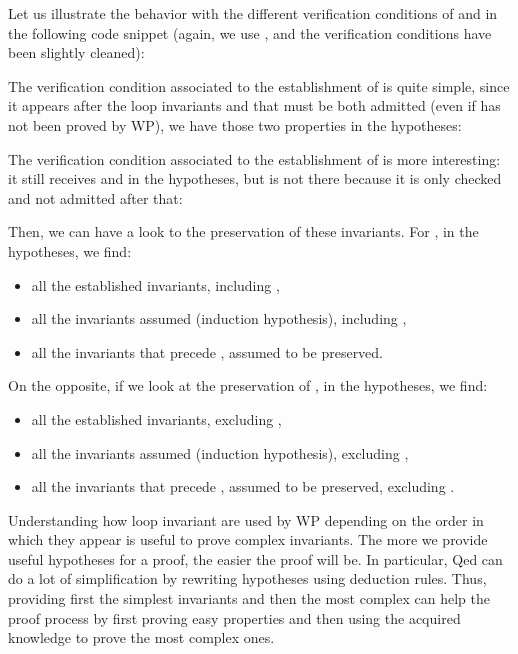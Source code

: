 Let us illustrate the behavior with the different verification conditions of
 and  in the following code snippet (again, we
use , and the verification conditions have been slightly
cleaned):




The verification condition associated to the establishment of  is
quite simple, since it appears after the loop invariants  and
 that must be both admitted (even if  has not been
proved by WP), we have those two properties in the hypotheses:




The verification condition associated to the establishment of  is
more interesting: it still receives  and  in the
hypotheses, but  is not there because it is only checked and not
admitted after that:




Then, we can have a look to the preservation of these invariants. For
, in the hypotheses, we find:
\begin{itemize}
  \item all the established invariants, including ,
  \item all the invariants assumed (induction hypothesis), including ,
  \item all the invariants that precede , assumed to be preserved.
\end{itemize}




On the opposite, if we look at the preservation of , in the
hypotheses, we find:
\begin{itemize}
  \item all the established invariants, excluding ,
  \item all the invariants assumed (induction hypothesis), excluding ,
  \item all the invariants that precede , assumed to be preserved,
        excluding .
\end{itemize}




Understanding how loop invariant are used by WP depending on the order in which
they appear is useful to prove complex invariants. The more we provide useful
hypotheses for a proof, the easier the proof will be. In particular, Qed can do
a lot of simplification by rewriting hypotheses using deduction rules. Thus,
providing first the simplest invariants and then the most complex can help the
proof process by first proving easy properties and then using the acquired
knowledge to prove the most complex ones.



